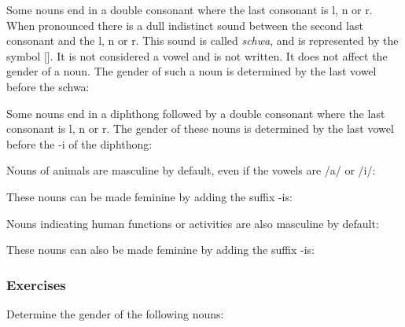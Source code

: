 Some nouns end in a double consonant where the last consonant is l, n or r. When pronounced there is a dull indistinct sound between the second last consonant and the l, n or r. This sound is called \textit{schwa}, and is represented by the symbol $[$\textschwa$]$. It is not considered a vowel and is not written. It does not affect the gender of a noun. The gender of such a noun is determined by the last vowel before the schwa:

Some nouns end in a diphthong followed by a double consonant where the last consonant is l, n or r. The gender of these nouns is determined by the last vowel before the -i of the diphthong:

Nouns of animals are masculine by default, even if the vowels are /a/ or /i/:

These nouns can be made feminine by adding the suffix -is:

Nouns indicating human functions or activities are also masculine by default:

These nouns can also be made feminine by adding the suffix -is:

\subsubsection{Exercises}

Determine the gender of the following nouns:

